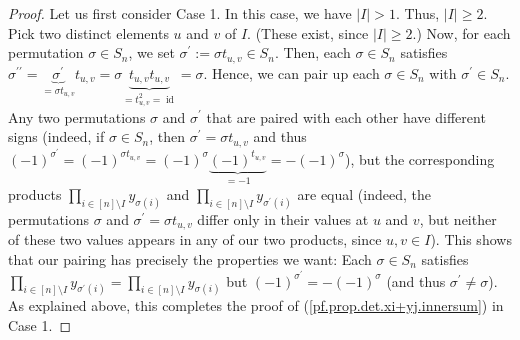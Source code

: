 \begin{proof}
Let us first consider Case 1. In this case, we have $\left\vert I\right\vert
>1$. Thus, $\left\vert I\right\vert \geq2$. Pick two distinct elements $u$ and
$v$ of $I$. (These exist, since $\left\vert I\right\vert \geq2$.) Now, for
each permutation $\sigma\in S_{n}$, we set $\sigma^{\prime}:=\sigma t_{u,v}\in
S_{n}$. Then, each $\sigma\in S_{n}$ satisfies $\sigma^{\prime\prime
}=\underbrace{\sigma^{\prime}}_{=\sigma t_{u,v}}t_{u,v}=\sigma
\underbrace{t_{u,v}t_{u,v}}_{=t_{u,v}^{2}=\operatorname*{id}}=\sigma$. Hence,
we can pair up each $\sigma\in S_{n}$ with $\sigma^{\prime}\in S_{n}$. Any two
permutations $\sigma$ and $\sigma^{\prime}$ that are paired with each other
have different signs (indeed, if $\sigma\in S_{n}$, then $\sigma^{\prime
}=\sigma t_{u,v}$ and thus $\left(  -1\right)  ^{\sigma^{\prime}}=\left(
-1\right)  ^{\sigma t_{u,v}}=\left(  -1\right)  ^{\sigma}\underbrace{\left(
-1\right)  ^{t_{u,v}}}_{=-1}=-\left(  -1\right)  ^{\sigma}$), but the
corresponding products $\prod\limits_{i\in\left[  n\right]  \setminus
I}y_{\sigma\left(  i\right)  }$ and $\prod\limits_{i\in\left[  n\right]
\setminus I}y_{\sigma^{\prime}\left(  i\right)  }$ are equal (indeed, the
permutations $\sigma$ and $\sigma^{\prime}=\sigma t_{u,v}$ differ only in
their values at $u$ and $v$, but neither of these two values appears in any of
our two products, since $u,v\in I$). This shows that our pairing has precisely
the properties we want: Each $\sigma\in S_{n}$ satisfies $\prod\limits_{i\in
\left[  n\right]  \setminus I}y_{\sigma^{\prime}\left(  i\right)  }%
=\prod\limits_{i\in\left[  n\right]  \setminus I}y_{\sigma\left(  i\right)  }$
but $\left(  -1\right)  ^{\sigma^{\prime}}=-\left(  -1\right)  ^{\sigma}$ (and
thus $\sigma^{\prime}\neq\sigma$). As explained above, this completes the
proof of (\ref{pf.prop.det.xi+yj.innersum}) in Case 1.


\end{proof}
